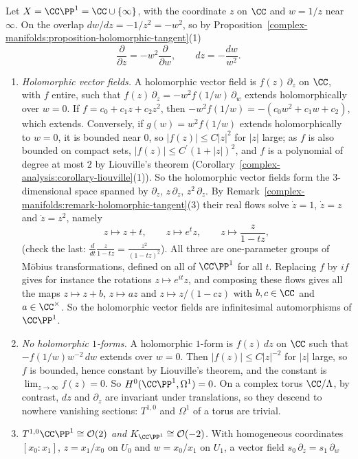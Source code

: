 \begin{example}\label{complex-manifolds:example-tangent-p1}
Let $X = \CC\PP^1 = \CC \cup \{\infty\}$, with the coordinate $z$ on $\CC$ and $w = 1/z$ near $\infty$. On the overlap $dw/dz = -1/z^2 = -w^2$, so by Proposition~\ref{complex-manifolds:proposition-holomorphic-tangent}(1)
\[
\frac{\partial}{\partial z} = -w^2\frac{\partial}{\partial w}, \qquad dz = -\frac{dw}{w^2}.
\]
\begin{enumerate}
\item \emph{Holomorphic vector fields.} A holomorphic vector field is $f(z)\,\partial_z$ on $\CC$, with $f$ entire, such that $f(z)\,\partial_z = -w^2f(1/w)\,\partial_w$ extends holomorphically over $w = 0$. If
$f = c_0 + c_1z + c_2z^2$, then $-w^2f(1/w) = -(c_0w^2 + c_1w + c_2)$, which extends. Conversely, if $g(w) = w^2f(1/w)$ extends holomorphically to $w = 0$, it is bounded near $0$, so $|f(z)| \leq C|z|^2$ for $|z|$
large; as $f$ is also bounded on compact sets, $|f(z)| \leq C^{\prime}(1 + |z|)^2$, and $f$ is a polynomial of degree at most $2$ by Liouville's theorem (Corollary~\ref{complex-analysis:corollary-liouville}(1)). So the
holomorphic vector fields form the $3$-dimensional space spanned by $\partial_z$, $z\,\partial_z$, $z^2\,\partial_z$. By Remark~\ref{complex-manifolds:remark-holomorphic-tangent}(3) their real flows solve
$\dot z = 1$, $\dot z = z$ and $\dot z = z^2$, namely
\[
z \mapsto z + t, \qquad z \mapsto e^tz, \qquad z \mapsto \frac{z}{1 - tz},
\]
(check the last: $\frac{d}{dt}\frac{z}{1 - tz} = \frac{z^2}{(1 - tz)^2}$). All three are one-parameter groups of M\"obius transformations, defined on all of $\CC\PP^1$ for all $t$. Replacing $f$ by $if$ gives for instance the rotations
$z \mapsto e^{it}z$, and composing these flows gives all the maps $z \mapsto z + b$, $z \mapsto az$ and $z \mapsto z/(1 - cz)$ with $b, c \in \CC$ and $a \in \CC^\times$. So the holomorphic vector fields are
infinitesimal automorphisms of $\CC\PP^1$.
\item \emph{No holomorphic $1$-forms.} A holomorphic $1$-form is $f(z)\,dz$ on $\CC$ such that $-f(1/w)w^{-2}\,dw$ extends over $w = 0$. Then $|f(z)| \leq C|z|^{-2}$ for $|z|$ large, so $f$ is bounded, hence constant
by Liouville's theorem, and the constant is $\lim_{z \to \infty}f(z) = 0$. So $H^0(\CC\PP^1, \Omega^1) = 0$. On a complex torus $\CC/\Lambda$, by contrast, $dz$ and $\partial_z$ are invariant under translations, so they
descend to nowhere vanishing sections: $T^{1,0}$ and $\Omega^1$ of a torus are trivial.
\item \emph{$T^{1,0}\CC\PP^1 \cong \mathcal{O}(2)$ and $K_{\CC\PP^1} \cong \mathcal{O}(-2)$.} With homogeneous coordinates $[x_0 : x_1]$, $z = x_1/x_0$ on $U_0$ and $w = x_0/x_1$ on $U_1$, a vector field $s_0\,\partial_z = s_1\,\partial_w$

\end{enumerate}
\end{example}
